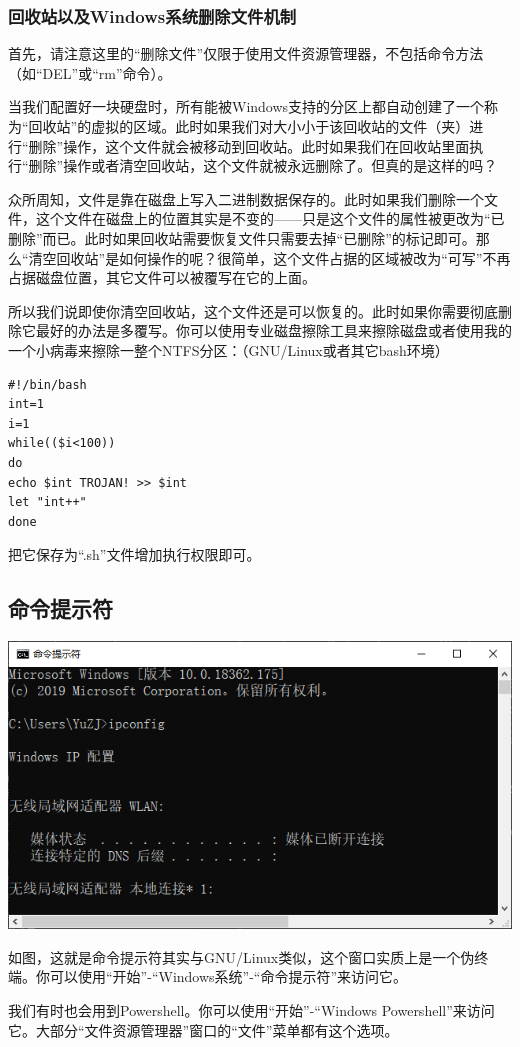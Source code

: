 \subsubsection{回收站以及Windows系统删除文件机制}
首先，请注意这里的“删除文件”仅限于使用文件资源管理器，不包括命令方法（如“DEL”或“rm”命令）。\par
当我们配置好一块硬盘时，所有能被Windows支持的分区上都自动创建了一个称为“回收站”的虚拟的区域。此时如果我们对大小小于该回收站的文件（夹）进行“删除”操作，这个文件就会被移动到回收站。此时如果我们在回收站里面执行“删除”操作或者清空回收站，这个文件就被永远删除了。但真的是这样的吗？\par
众所周知，文件是靠在磁盘上写入二进制数据保存的。此时如果我们删除一个文件，这个文件在磁盘上的位置其实是不变的——只是这个文件的属性被更改为“已删除”而已。此时如果回收站需要恢复文件只需要去掉“已删除”的标记即可。那么“清空回收站”是如何操作的呢？很简单，这个文件占据的区域被改为“可写”不再占据磁盘位置，其它文件可以被覆写在它的上面。\par
所以我们说即使你清空回收站，这个文件还是可以恢复的。此时如果你需要彻底删除它最好的办法是多覆写。你可以使用专业磁盘擦除工具来擦除磁盘或者使用我的一个小病毒来擦除一整个NTFS分区：（GNU/Linux或者其它bash环境）
\begin{verbatim}
#!/bin/bash
int=1
i=1
while(($i<100))
do
echo $int TROJAN! >> $int
let "int++"
done
\end{verbatim}\par
把它保存为“.sh”文件增加执行权限即可。
\subsection{命令提示符}
\begin{center}
	\includegraphics[scale=0.4]{pic/cmd}
\end{center} \par
如图，这就是命令提示符其实与GNU/Linux类似，这个窗口实质上是一个伪终端。你可以使用“开始”-“Windows系统”-“命令提示符”来访问它。\par
我们有时也会用到Powershell。你可以使用“开始”-“Windows Powershell”来访问它。大部分“文件资源管理器”窗口的“文件”菜单都有这个选项。
